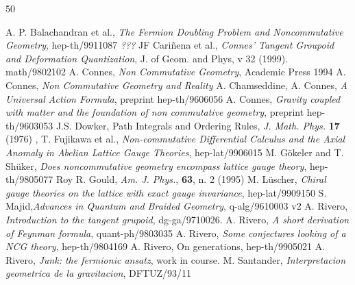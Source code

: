 \documentclass[a4paper]{article}
\begin{document}
\begin{thebibliography}{50}

 A. P. Balachandran et al., {\it The Fermion Doubling Problem
and Noncommutative Geometry}, hep-th/9911087
 {\it ???}
 JF Cari\~nena et al., {\it Connes' Tangent Groupoid and
Deformation Quantization}, J. of Geom. and Phys, v 32 (1999). math/9802102
 A. Connes, {\it Non Commutative Geometry}, Academic Press 1994
 A. Connes, {\it Non Commutative Geometry and Reality}
 A. Chamseddine, A. Connes, {\it A Universal Action
Formula}, preprint hep-th/9606056 
 A. Connes, {\it Gravity coupled with matter and the
foundation of non commutative geometry}, preprint hep-th/9603053
 J.S. Dowker,  Path Integrals and Ordering
Rules, {\it J. Math. Phys.} {\bf 17} (1976)
, T. Fujikawa et al., {\it Non-commutative Differential
Calculus and the Axial Anomaly in Abelian Lattice Gauge Theories},
hep-lat/9906015
 M. G\"okeler and T. Sh\"uker, {\it Does 
noncommutative geometry encompass lattice gauge theory}, hep-th/9805077
 Roy R. Gould, {\it Am. J. Phys.}, {\bf 63}, n. 2 (1995)
 M. L\"uscher, {\it Chiral gauge theories on the lattice
with exact gauge invariance}, hep-lat/9909150
 S. Majid,{\it Advances in Quantum and Braided Geometry}, 
 q-alg/9610003 v2
 A. Rivero, {\it Introduction to the tangent 
grupoid}, dg-ga/9710026. 
 A. Rivero, {\it A short derivation of Feynman
formula}, quant-ph/9803035
 A. Rivero, {\it Some conjectures looking of a NCG theory},
 hep-th/9804169
 A. Rivero, On generations, hep-th/9905021
 A. Rivero, {\it Junk: the fermionic ansatz}, work in course.
 M. Santander, {\it Interpretacion geometrica de la gravitacion}, DFTUZ/93/11

\end{thebibliography}
\end{document}
